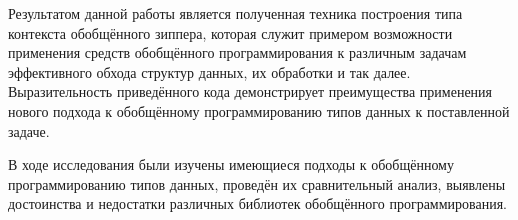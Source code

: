 \Conc

Результатом данной работы является полученная техника построения типа контекста обобщённого зиппера, которая служит примером возможности применения средств обобщённого программирования к различным задачам эффективного обхода структур данных, их обработки и так далее. Выразительность приведённого кода демонстрирует преимущества применения нового подхода к обобщённому программированию типов данных к поставленной задаче.

В ходе исследования были изучены имеющиеся подходы к обобщённому программированию типов данных, проведён их сравнительный анализ, выявлены достоинства и недостатки различных библиотек обобщённого программирования.

\printbibliography[heading=bibintoc%
]

\appendix
{}


